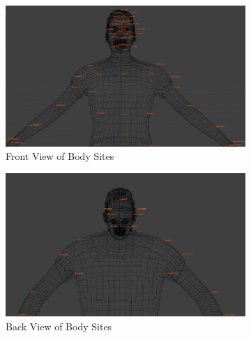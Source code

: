 \documentclass[../../main.tex]{subfiles}
\begin{document}
\begin{figure}[h]
    \centering
    \begin{subfigure}[b]{0.3\textwidth}
        \centering
        \includegraphics[width=\textwidth]{chapters/avatar_creation_pose_synthesis/images/sites_body_front.png}
        \caption{Front View of Body Sites}
        \label{fig:sites_body_front}
    \end{subfigure}
    \hfill
    \begin{subfigure}[b]{0.3\textwidth}
        \centering
        \includegraphics[width=\textwidth]{chapters/avatar_creation_pose_synthesis/images/sites_body_back.png}
        \caption{Back View of Body Sites}
        \label{fig:sites_body_back}
    \end{subfigure}
    \hfill
    \begin{subfigure}[b]{0.3\textwidth}
        \centering

\end{subfigure}
\end{figure}
\end{document}
